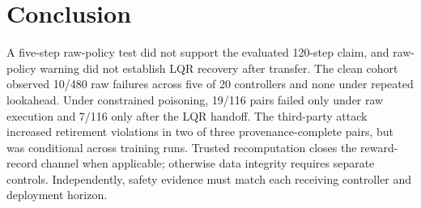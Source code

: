 \section{Conclusion}
\label{sec:conclusion}

A five-step raw-policy test did not support the evaluated 120-step claim, and
raw-policy warning did not establish LQR recovery after transfer.  The clean
cohort observed 10/480 raw failures across five of 20 controllers and none
under repeated lookahead.  Under constrained poisoning, 19/116 pairs failed
only under raw execution and 7/116 only after the LQR handoff.  The third-party
attack increased retirement violations in two of three provenance-complete
pairs, but was conditional across training runs.  Trusted recomputation closes
the reward-record channel when applicable; otherwise data integrity requires
separate controls.  Independently, safety evidence must match each receiving
controller and deployment horizon.
